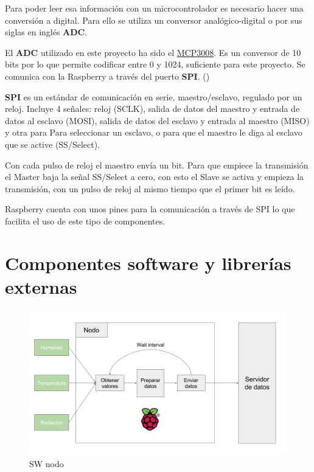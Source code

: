 Para poder leer esa información con un microcontrolador es necesario hacer una conversión a digital. Para ello se utiliza un conversor analógico-digital o por sus siglas en inglés \textbf{ADC}.

El \textbf{ADC} utilizado en este proyecto ha sido el \href{https://cdn-shop.adafruit.com/datasheets/MCP3008.pdf}{MCP3008}. Es un conversor de 10 bits por lo que permite codificar entre 0 y 1024, suficiente para este proyecto. Se comunica con la Raspberry a través del puerto \textbf{SPI}. (\cite{ARP:Adafruit:2017})

\textbf{SPI} es un estándar de comunicación en serie, maestro/esclavo, regulado por un reloj. Incluye 4 señales: reloj (SCLK), salida de datos del maestro y entrada de datos al esclavo (MOSI), salida de datos del esclavo y entrada al maestro (MISO) y otra para Para seleccionar un esclavo, o para que el maestro le diga al esclavo que se active (SS/Select).

Con cada pulso de reloj el maestro envía un bit. Para que empiece la transmisión el Master baja la señal SS/Select a cero, con esto el Slave se activa y empieza la transmisión, con un pulso de reloj al mismo tiempo que el primer bit es leído.

Raspberry cuenta con unos pines para la comunicación a través de SPI lo que facilita el uso de este tipo de componentes.

\section{Componentes software y librerías externas}
\label{makereference2.4}

\begin{figure}[htb]
	\begin{center}
		\includegraphics[width=15cm]{figures/diagrama_nodo.png}
		\caption{SW nodo}
	\end{center}
	
	\label{diagrama_sw_nodo}
\end{figure}

